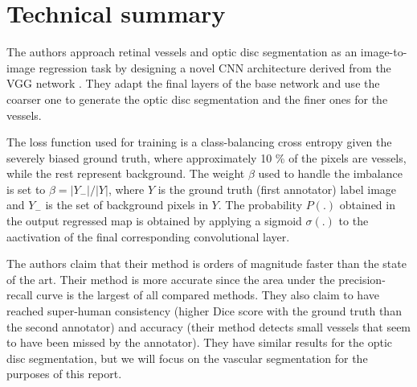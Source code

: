 \section{Technical summary}


The authors approach retinal vessels and optic disc segmentation as an image-to-image regression task by designing a novel CNN architecture derived from the VGG network \cite{simonyan_very_2014}. They adapt the final layers of the base network and use the coarser one to generate the optic disc segmentation and the finer ones for the vessels.

The loss function used for training is a class-balancing cross entropy given the severely biased ground truth, where approximately 10 \% of the pixels are vessels, while the rest represent background. The weight $\beta$ used to handle the imbalance is set to $\beta = |Y_-| / |Y|$, where $Y$ is the ground truth (first annotator) label image and $Y_-$ is the set of background pixels in $Y$. The probability $P(.)$ obtained in the output regressed map is obtained by applying a sigmoid $\sigma(.)$ to the aactivation of the final corresponding convolutional layer.

The authors claim that their method is orders of magnitude faster than the state of the art. Their method is more accurate since the area under the precision-recall curve is the largest of all compared methods. They also claim to have reached super-human consistency (higher Dice score with the ground truth than the second annotator) and accuracy (their method detects small vessels that seem to have been missed by the annotator). They have similar results for the optic disc segmentation, but we will focus on the vascular segmentation for the purposes of this report.
